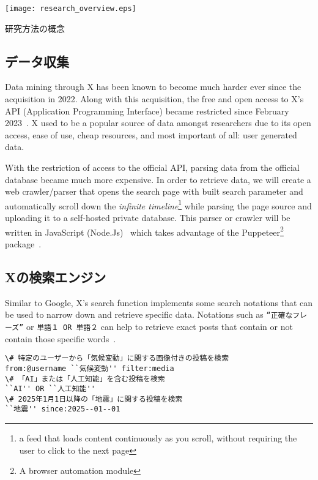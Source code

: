 \documentclass{jabstract}
\begin{document}
\begin{multicols}{2}
\begin{figurehere}
    \centering
    \texttt{[image: research\_overview.eps]}
    \caption{研究方法の概念}\label{fig:general-overview}
\end{figurehere}
\subsection{データ収集}
Data mining through X has been known to become much harder ever since the acquisition in 2022. Along with this acquisition, the free and open access to X's API (Application Programming Interface) became restricted since February 2023~\cite{twitter_api_free_access_2023}. X used to be a popular source of data amongst researchers due to its open access, ease of use, cheap resources, and most important of all: user generated data. 

With the restriction of access to the official API, parsing data from the official database became much more expensive. In order to retrieve data, we will create a web crawler/parser that opens the search page with built search parameter and automatically scroll down the \textit{infinite timeline}\footnote{a feed that loads content continuously as you scroll, without requiring the user to click to the next page} while parsing the page source and uploading it to a self-hosted private database. This parser or crawler will be written in JavaScript (Node.Js)~\cite{nodejs} which takes advantage of the Puppeteer\footnote{A browser automation module} package~\cite{puppeteer}. 

\subsection{Xの検索エンジン}\label{sec:x-search-enging}
Similar to Google, X's search function implements some search notations that can be used to narrow down and retrieve specific data. Notations such as \texttt{``正確なフレーズ''} or \texttt{単語１ OR 単語２} can help to retrieve exact posts that contain or not contain those specific words~\cite{twitter_search_operators}. 

\begin{verbatim}
\# 特定のユーザーから「気候変動」に関する画像付きの投稿を検索
from:@username ``気候変動'' filter:media
\# 「AI」または「人工知能」を含む投稿を検索
``AI'' OR ``人工知能''
\# 2025年1月1日以降の「地震」に関する投稿を検索
``地震'' since:2025--01--01
\end{verbatim}


\end{multicols}
\end{document}
